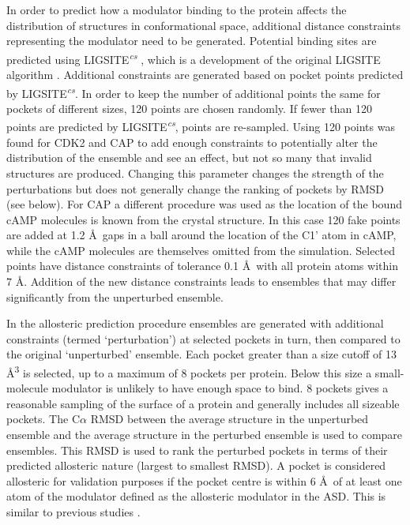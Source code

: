 In order to predict how a modulator binding to the protein affects the distribution of structures in conformational space, additional distance constraints representing the modulator need to be generated.
Potential binding sites are predicted using LIGSITE\textsuperscript{\it cs} \cite{Huang2006}, which is a development of the original LIGSITE algorithm \cite{Hendlich1997}.
Additional constraints are generated based on pocket points predicted by LIGSITE\textsuperscript{\it cs}.
In order to keep the number of additional points the same for pockets of different sizes, 120 points are chosen randomly.
If fewer than 120 points are predicted by LIGSITE\textsuperscript{\it cs}, points are re-sampled.
Using 120 points was found for CDK2 and CAP to add enough constraints to potentially alter the distribution of the ensemble and see an effect, but not so many that invalid structures are produced.
Changing this parameter changes the strength of the perturbations but does not generally change the ranking of pockets by RMSD (see below).
For CAP a different procedure was used as the location of the bound cAMP molecules is known from the crystal structure.
In this case 120 fake points are added at 1.2 \AA\ gaps in a ball around the location of the C1' atom in cAMP, while the cAMP molecules are themselves omitted from the simulation.
Selected points have distance constraints of tolerance 0.1 \AA\ with all protein atoms within 7 \AA.
Addition of the new distance constraints leads to ensembles that may differ significantly from the unperturbed ensemble.

In the allosteric prediction procedure ensembles are generated with additional constraints (termed `perturbation') at selected pockets in turn, then compared to the original `unperturbed' ensemble.
Each pocket greater than a size cutoff of 13 \AA\textsuperscript{3} is selected, up to a maximum of 8 pockets per protein.
Below this size a small-molecule modulator is unlikely to have enough space to bind.
8 pockets gives a reasonable sampling of the surface of a protein and generally includes all sizeable pockets.
The C$\alpha$ RMSD between the average structure in the unperturbed ensemble and the average structure in the perturbed ensemble is used to compare ensembles.
This RMSD is used to rank the perturbed pockets in terms of their predicted allosteric nature (largest to smallest RMSD).
A pocket is considered allosteric for validation purposes if the pocket centre is within 6 \AA\ of at least one atom of the modulator defined as the allosteric modulator in the ASD.
This is similar to previous studies \cite{Panjkovich2012}.


